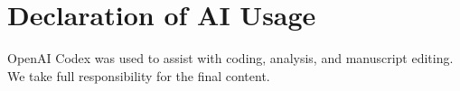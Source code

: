\section*{Declaration of AI Usage} OpenAI Codex was used to assist with coding, analysis, and manuscript editing. We take full responsibility for the final content.
